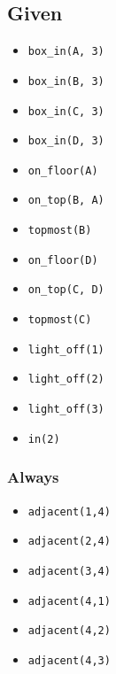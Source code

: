\documentclass[12pt]{article}
\begin{document}
\subsection{Given}
\begin{itemize}
  \item \texttt{box\_in(A, 3)}
  \item \texttt{box\_in(B, 3)}
  \item \texttt{box\_in(C, 3)}
  \item \texttt{box\_in(D, 3)}
  \item \texttt{on\_floor(A)}
  \item \texttt{on\_top(B, A)}
  \item \texttt{topmost(B)}
  \item \texttt{on\_floor(D)}
  \item \texttt{on\_top(C, D)}
  \item \texttt{topmost(C)}
  \item \texttt{light\_off(1)}
  \item \texttt{light\_off(2)}
  \item \texttt{light\_off(3)}
  \item \texttt{in(2)}
\end{itemize}

\subsubsection{Always}
\begin{itemize}
  \item \texttt{adjacent(1,4)}
  \item \texttt{adjacent(2,4)}
  \item \texttt{adjacent(3,4)}
  \item \texttt{adjacent(4,1)}
  \item \texttt{adjacent(4,2)}
  \item \texttt{adjacent(4,3)}
\end{itemize}
\end{document}
